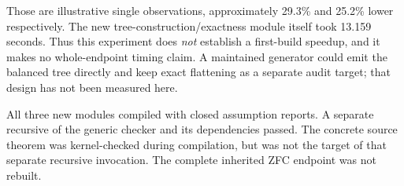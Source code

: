 Those are illustrative single observations, approximately 29.3\% and 25.2\%
lower respectively. The new tree-construction/exactness module itself took
13.159 seconds. Thus this experiment does \emph{not} establish a first-build
speedup, and it makes no whole-endpoint timing claim. A maintained generator
could emit the balanced tree directly and keep exact flattening as a
separate audit target; that design has not been measured here.

All three new modules compiled with closed assumption reports. A separate
recursive  of the generic checker and its dependencies passed.
The concrete source theorem was kernel-checked during compilation, but was
not the target of that separate recursive invocation. The complete inherited
ZFC endpoint was not rebuilt.
